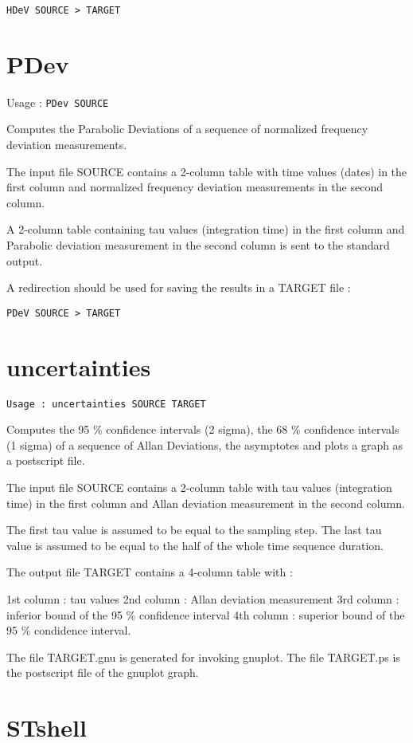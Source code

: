 \documentclass[12pt,a4paper,french]{article}
\begin{document}
{\tt{HDeV SOURCE > TARGET}}

\section{PDev}

Usage : {\tt{PDev SOURCE}}

Computes the Parabolic Deviations of a sequence of normalized frequency deviation measurements.

The input file SOURCE contains a 2-column table with time values (dates) in the first column and normalized frequency deviation measurements in the second column.

A 2-column table containing tau values (integration time) in the first column and Parabolic deviation measurement in the second column is sent to the standard output.

A redirection should be used for saving the results in a TARGET file : 

{\tt{PDeV SOURCE > TARGET}}

\section{uncertainties}

{\tt{Usage : uncertainties SOURCE TARGET}}

Computes the 95 \% confidence intervals (2 sigma), the 68 \% confidence intervals (1 sigma) of a sequence of Allan Deviations, the asymptotes and plots a graph as a postscript file.

The input file SOURCE contains a 2-column table with tau values (integration time) in the first column and Allan deviation measurement in the second column.

The first tau value is assumed to be equal to the sampling step.
The last tau value is assumed to be equal to the half of the whole time sequence duration.

The output file TARGET contains a 4-column table with :

    1st column : tau values
    2nd column : Allan deviation measurement
    3rd column : inferior bound of the 95 \% confidence interval
    4th column : superior bound of the 95 \% condidence interval.

The file TARGET.gnu is generated for invoking gnuplot.
The file TARGET.ps is the postscript file of the gnuplot graph.

\section{STshell}
\end{document}
